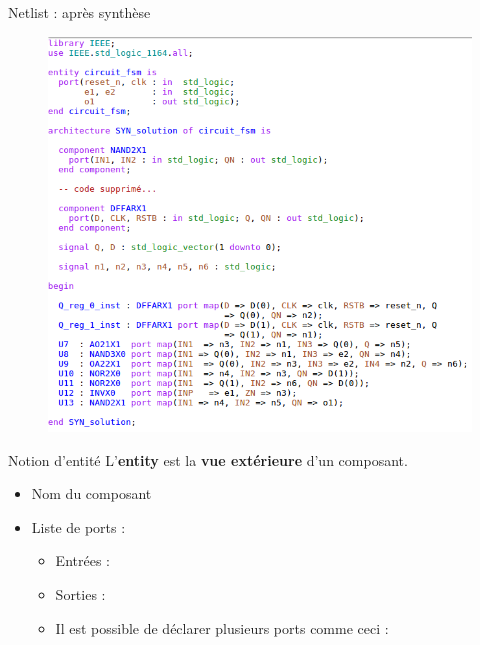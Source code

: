 \documentclass[xcolor=table]{beamer} %
\begin{document}
\begin{frame}{Netlist : après synthèse}
  \begin{figure}[h]
    \centering
    \includegraphics[scale=0.4]{./figures/netlist.png}
  \end{figure}
\end{frame}


\begin{frame}{Notion d'entité}
  L'\textbf{entity} est la \textbf{vue extérieure} d'un composant.
  \begin{itemize}
    \item Nom du composant
    \item Liste de ports :
    \begin{itemize}
      \item Entrées : 
      \item Sorties : 
      \item Il est possible de déclarer plusieurs ports comme ceci : 
    \end{itemize}
  \end{itemize}
\end{frame}
\end{document}

